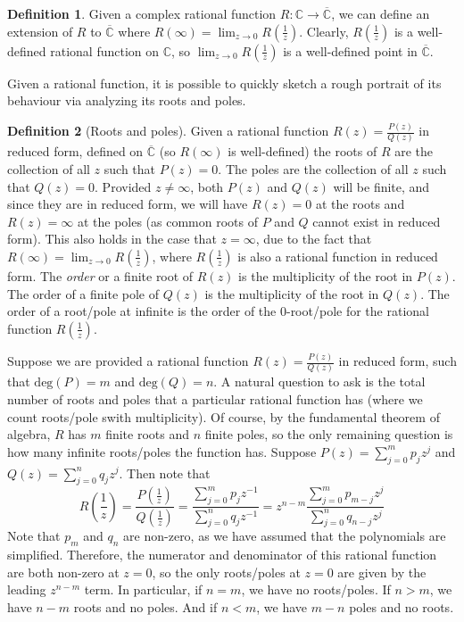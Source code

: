 \documentclass[aps,pra,showpacs,notitlepage,onecolumn,superscriptaddress,nofootinbib]{revtex4-1}
\theoremstyle{definition}
\newtheorem{definition}{Definition}[section]
\begin{document}
\begin{definition}
  Given a complex rational function $R : \mathbb{C} \rightarrow \overline{\mathbb{C}}$, we can define an extension of $R$ to $\overline{\mathbb{C}}$ where $R(\infty) = \lim_{z \to 0} R\left(\frac{1}{z}\right)$. Clearly, $R\left(\frac{1}{z}\right)$ is a well-defined
  rational function on $\mathbb{C}$, so $\lim_{z \to 0} R\left( \frac{1}{z} \right)$ is a well-defined point in $\overline{\mathbb{C}}$.
  \end{definition}

Given a rational function, it is possible to quickly sketch a rough portrait of its behaviour via analyzing its roots and poles.

\begin{definition}[Roots and poles]
  Given a rational function $R(z) = \frac{P(z)}{Q(z)}$ in reduced form, defined on $\overline{\mathbb{C}}$ (so $R(\infty)$ is well-defined)
  the roots of $R$ are the collection of all $z$ such that $P(z) = 0$. The poles are the collection of all $z$ such that $Q(z) = 0$.
  Provided $z \neq \infty$, both $P(z)$ and $Q(z)$ will be finite, and since they are in reduced form, we will have $R(z) = 0$ at the roots and $R(z) = \infty$ at the poles (as common roots of $P$ and $Q$ cannot exist in reduced form).
  This also holds in the case that $z = \infty$, due to the fact that $R(\infty) = \lim_{z \to 0} R\left(\frac{1}{z}\right)$, where $R\left( \frac{1}{z} \right)$ is also a rational function in reduced form.
  The \emph{order} or a finite root of $R(z)$ is the multiplicity of the root in $P(z)$. The order of a finite pole of $Q(z)$ is the multiplicity of the root in $Q(z)$. The order of a root/pole at infinite is the order of the $0$-root/pole
  for the rational function $R\left(\frac{1}{z}\right)$.
\end{definition}

\noindent Suppose we are provided a rational function $R(z) = \frac{P(z)}{Q(z)}$ in reduced form, such that $\text{deg}(P) = m$ and $\text{deg}(Q) = n$. A natural question to ask is the total number of roots and poles that
a particular rational function has (where we count roots/pole swith multiplicity). Of course, by the fundamental theorem of algebra, $R$ has $m$ finite roots and $n$ finite poles, so the only remaining question is
how many infinite roots/poles the function has. Suppose $P(z) = \sum_{j = 0}^{m} p_j z^{j}$ and $Q(z) = \sum_{j = 0}^{n} q_j z^j$. Then note that
\begin{equation}
  R\left(\frac{1}{z}\right) = \frac{P\left(\frac{1}{z}\right)}{Q\left(\frac{1}{z}\right)} = \frac{\sum_{j = 0}^{m} p_j z^{-1}}{\sum_{j = 0}^{n} q_j z^{-1}} = z^{n - m} \frac{\sum_{j = 0}^{m} p_{m - j} z^{j}}{\sum_{j = 0}^{n} q_{n - j} z^{j}}
\end{equation}
Note that $p_m$ and $q_n$ are non-zero, as we have assumed that the polynomials are simplified. Therefore, the numerator and denominator of this rational function are both non-zero at $z = 0$, so the only roots/poles at $z = 0$ are given
by the leading $z^{n - m}$ term. In particular, if $n = m$, we have no roots/poles. If $n > m$, we have $n - m$ roots and no poles. And if $n < m$, we have $m - n$ poles and no roots.
\end{document}
